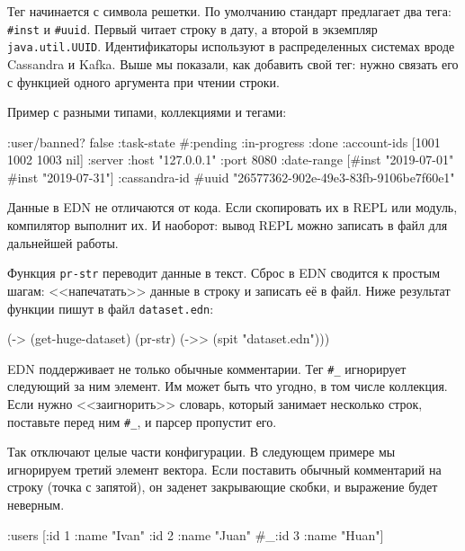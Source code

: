 
Тег начинается с символа решетки. По умолчанию стандарт предлагает два тега:
\verb|#inst| и \verb|#uuid|. Первый читает строку в дату, а второй в
экземпляр \verb|java.util.UUID|. Идентификаторы используют в распределенных
системах вроде Cassandra и Kafka. Выше мы показали, как добавить свой тег: нужно
связать его с функцией одного аргумента при чтении строки.

Пример с разными типами, коллекциями и тегами:

\begin{english}
  \begin{clojure}
{:user/banned? false
 :task-state #{:pending :in-progress :done}
 :account-ids [1001 1002 1003 nil]
 :server {:host "127.0.0.1" :port 8080}
 :date-range [#inst "2019-07-01" #inst "2019-07-31"]
 :cassandra-id #uuid "26577362-902e-49e3-83fb-9106be7f60e1"}
  \end{clojure}
\end{english}

Данные в EDN не отличаются от кода. Если скопировать их в REPL или модуль,
компилятор выполнит их. И наоборот: вывод REPL можно записать в файл для
дальнейшей работы.

Функция \verb|pr-str| переводит данные в текст. Сброс в EDN сводится к простым
шагам: <<напечатать>> данные в строку и записать её в файл. Ниже результат
функции пишут в файл \verb|dataset.edn|:

\begin{english}
  \begin{clojure}
(-> (get-huge-dataset)
    (pr-str)
    (->> (spit "dataset.edn")))
  \end{clojure}
\end{english}


EDN поддерживает не только обычные комментарии. Тег \verb|#_| игнорирует
следующий за ним элемент. Им может быть что угодно, в том числе коллекция. Если
нужно <<заигнорить>> словарь, который занимает несколько строк, поставьте перед
ним \verb|#_|, и парсер пропустит его.


Так отключают целые части конфигурации. В следующем примере мы игнорируем третий
элемент вектора. Если поставить обычный комментарий на строку (точка с запятой),
он заденет закрывающие скобки, и выражение будет неверным.

\begin{english}
  \begin{clojure}
{:users [{:id 1 :name "Ivan"}
         {:id 2 :name "Juan"}
         #_{:id 3 :name "Huan"}]}
  \end{clojure}
\end{english}

